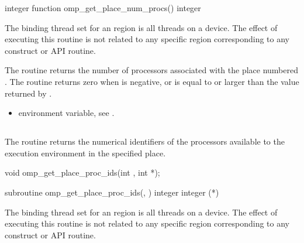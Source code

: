 \begin{fortranspecific}
\begin{ompfFunction}
integer function omp_get_place_num_procs()
integer 
\end{ompfFunction}
\end{fortranspecific}

\binding
The binding thread set for an   region is all threads on a device. The effect of executing this routine is not related to any specific region corresponding to any construct or API routine.

\effect
The  routine returns the number of 
processors associated with the place numbered . The 
routine returns zero when  is negative, or is equal 
to or larger than the value returned by . 

\crossreferences
\begin{itemize}
\item {} environment variable, see 
.
\end{itemize}




\subsection{}
\label{subsec:omp_get_place_proc_ids}

\summary
The  routine returns the numerical identifiers of the processors available to the execution environment in the specified place.

\format
\begin{ccppspecific}
\begin{ompcFunction}
void omp_get_place_proc_ids(int , int *);
\end{ompcFunction}
\end{ccppspecific}

\begin{fortranspecific}
\begin{ompfSubroutine}
subroutine omp_get_place_proc_ids(, )
integer 
integer (*)
\end{ompfSubroutine}
\end{fortranspecific}

\binding
The binding thread set for an  region is all 
threads on a device. The effect of executing this routine is not related to 
any specific region corresponding to any construct or API routine.

